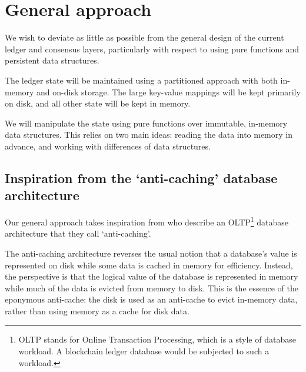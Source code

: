 \documentclass[11pt,a4paper]{article}
\begin{document}
\section{General approach}
\label{general-approach}

We wish to deviate as little as possible from the general design of the current
ledger and consensus layers, particularly with respect to using pure functions
and persistent data structures.

The ledger state will be maintained using a partitioned approach with both
in-memory and on-disk storage. The large key-value mappings will be kept primarily on
disk, and all other state will be kept in memory.

We will manipulate the state using pure functions over immutable, in-memory data
structures. This relies on two main ideas: reading the data into memory in
advance, and working with differences of data structures.

\subsection{Inspiration from the `anti-caching' database architecture}
\label{anti-caching}

Our general approach takes inspiration from \citet{anti-caching} who describe an
OLTP\footnote{OLTP stands for Online Transaction Processing, which is a style of
database workload. A blockchain ledger database would be subjected to such a
workload.} database architecture that they call `anti-caching'.

The anti-caching architecture reverses the usual notion that a database's value
is represented on disk while some data is cached in memory for efficiency.
Instead, the perspective is that the logical value of the database is
represented in memory while much of the data is evicted from memory to disk.
This is the essence of the eponymous anti-cache: the disk is used as an
anti-cache to evict in-memory data, rather than using memory as a cache for disk
data.

\end{document}
